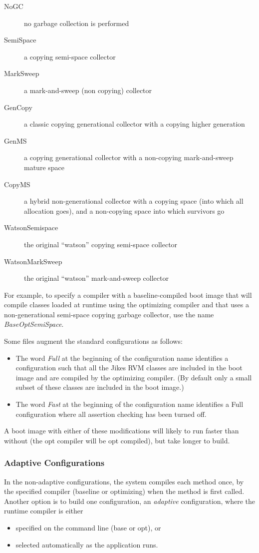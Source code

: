\begin{description}
\item[NoGC] no garbage collection is performed
\item[SemiSpace] a copying semi-space collector
\item[MarkSweep] a mark-and-sweep (non copying) collector
\item[GenCopy] a classic copying generational collector with a copying
  higher generation
\item[GenMS] a copying generational collector with a non-copying
  mark-and-sweep mature space
\item[CopyMS] a hybrid non-generational collector with a copying space
  (into which all allocation goes), and a non-copying space into which
  survivors go
\item[WatsonSemispace] the original ``watson'' copying semi-space collector 
\item[WatsonMarkSweep] the original ``watson'' mark-and-sweep collector
\end{description}

For example, to specify a compiler with a baseline-compiled boot image
that will compile classes loaded at runtime using the optimizing compiler and that uses
a non-generational semi-space copying garbage collector, use the name 
{\em BaseOptSemiSpace}.

Some files augment the standard configurations as follows:
\begin{itemize}
\item The word 
{\em Full} at the beginning of the configuration name identifies a 
configuration
such that all the Jikes RVM classes are included in the boot image 
and are compiled by the optimizing compiler. 
(By default only
a small subset of these classes are included in the boot image.)
\item The word
{\em Fast} at the beginning of the configuration name identifies a Full
configuration where all assertion checking has been turned off. 
\end{itemize}
A boot image with
either of these modifications will likely to run faster than without
(the opt compiler will be opt compiled), but take longer to build.  

\subsubsection{Adaptive Configurations} \label{adaptive-configs}
In the non-adaptive configurations, the system compiles each
method once, by the specified
compiler (baseline or optimizing) when the method is first called.  
Another option is to build one configuration, 
an {\em adaptive} configuration,
where the runtime compiler is either
\begin{itemize}
\item specified on the command line (base or opt), or
\item selected automatically as the application runs.
\end{itemize}

